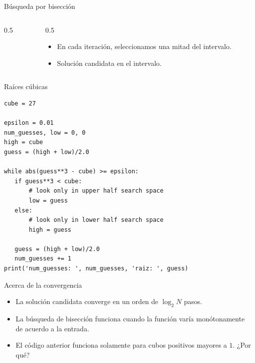 \documentclass[mathserif]{beamer}
\begin{document}
\begin{frame}[fragile]{Búsqueda por bisección}
    \begin{columns}
        \begin{column}{0.5\textwidth}
            \centering
            
        \end{column}
        \begin{column}{0.5\textwidth}
            \begin{itemize}
                \item En cada iteración, seleccionamos una {\blue mitad} del intervalo.
                \item Solución candidata en el intervalo.
            \end{itemize}
        \end{column}
    \end{columns}
\end{frame}


\begin{frame}[fragile]{Raíces cúbicas}
\begin{lstlisting}
cube = 27

epsilon = 0.01
num_guesses, low = 0, 0
high = cube
guess = (high + low)/2.0

while abs(guess**3 - cube) >= epsilon:
   if guess**3 < cube:
       # look only in upper half search space
       low = guess
   else:
       # look only in lower half search space
       high = guess
   
   guess = (high + low)/2.0
   num_guesses += 1
print('num_guesses: ', num_guesses, 'raiz: ', guess)
\end{lstlisting}
\end{frame}

\begin{frame}[fragile]{Acerca de la convergencia}
    \begin{itemize}
        \item La solución candidata converge en un orden de $\log_2 N$ pasos.
        \item La {\blue búsqueda de bisección} funciona cuando la función varía {\blue monótonamente} de acuerdo a la entrada.
        
        \item El código anterior funciona solamente para cubos positivos mayores a $1$. ¿Por qué?
    \end{itemize}
    
\end{frame}
\end{document}

